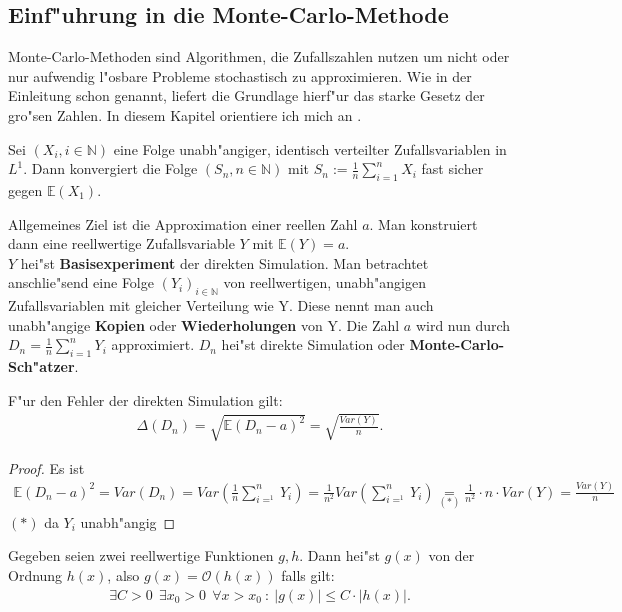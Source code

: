\subsection{Einf"uhrung in die Monte-Carlo-Methode}

Monte-Carlo-Methoden sind Algorithmen, die Zufallszahlen nutzen um nicht oder nur aufwendig l"osbare Probleme stochastisch zu approximieren. Wie in der Einleitung schon genannt, liefert die Grundlage hierf"ur das starke Gesetz der gro"sen Zahlen.
In diesem Kapitel orientiere ich mich an \cite{MC}.
\begin{sz}
Sei $(X_i, i\in\mathbb{N})$ eine Folge unabh"angiger, identisch verteilter
Zufallsvariablen in $L^1$. Dann konvergiert die Folge $(S_n, n \in \mathbb{N})$
mit $S_n := \frac{1}{n}\sum_{i=1}^n X_i$ 
fast sicher gegen $\mathbb{E}(X_1).$
\end{sz}
Allgemeines Ziel ist die Approximation einer reellen Zahl $a$. Man konstruiert dann eine reellwertige Zufallsvariable $Y$ mit 
$\mathbb{E}(Y) = a.$\\
$Y$ hei"st \textbf{Basisexperiment} der direkten Simulation.
Man betrachtet anschlie"send eine Folge $(Y_i)_{i\in\mathbb{N}}$ von reellwertigen, unabh"angigen
Zufallsvariablen mit gleicher Verteilung wie Y.
Diese nennt man auch unabh"angige \textbf{Kopien} oder
\textbf{Wiederholungen} von Y.
Die Zahl $a$ wird nun durch $D_n =\frac{1}{n}\sum_{i=1}^n Y_i$ approximiert.
$D_n$ hei"st direkte Simulation oder \textbf{Monte-Carlo-Sch"atzer}.
\begin{sz}\label{var}
F"ur den Fehler der direkten Simulation gilt:
\begin{align*}
\Delta (D_n)=\sqrt{\mathbb{E}(D_n-a)^2}=\sqrt{\frac{Var(Y)}{n}}.
\end{align*}
\end{sz}
\begin{proof}
Es ist 
\begin{align*}
\mathbb{E}(D_n-a)^2= Var(D_n)=Var\left(\frac{1}{n}\sum_{i=^1}^n Y_i\right)=\frac{1}{n^2}Var\left(\sum_{i=^1}^n Y_i\right)\underset{(*)}{=}\frac{1}{n^2}\cdot n\cdot Var(Y)=\frac{Var(Y)}{n}
\end{align*}
$(*)$ da  $Y_i$ unabh"angig 
\end{proof}

\begin{df}
Gegeben seien zwei reellwertige Funktionen $g,h$. Dann hei"st $g(x)$ von der Ordnung $h(x)$, also $g(x)=\mathcal{O}(h(x))$ falls gilt:
\begin{align*}
\exists C>0 \ \ \exists x_0>0\ \ \forall x>x_0\ : \ |g(x)|\leq C \cdot |h(x)|.
\end{align*}
\end{df}

